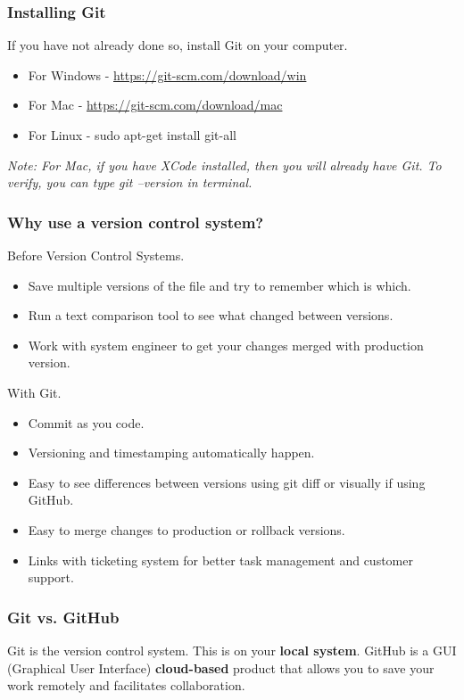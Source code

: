 \documentclass{beamer}
\begin{document}
\begin{frame}\frametitle{Installing Git}
If you have not already done so, install Git on your computer.
\vspace{1cm}
\begin{itemize}
\item For Windows - \url{https://git-scm.com/download/win}
\item For Mac - \url{https://git-scm.com/download/mac}
\item For Linux - sudo apt-get install git-all
\end{itemize}
\vspace{1cm}
\emph{Note: For Mac, if you have XCode installed, then you will already have Git. To verify, you can type git --version in terminal.}
\end{frame}

\begin{frame}\frametitle{Why use a version control system?}
Before Version Control Systems.
\begin{itemize}
\item Save multiple versions of the file and try to remember which is which.
\item Run a text comparison tool to see what changed between versions.
\item Work with system engineer to get your changes merged with production version.
\end{itemize}
With Git.
\begin{itemize}
\item Commit as you code.
\item Versioning and timestamping automatically happen.
\item Easy to see differences between versions using git diff or visually if using GitHub.
\item Easy to merge changes to production or rollback versions.
\item Links with ticketing system for better task management and customer support.
\end{itemize}
\end{frame}

\begin{frame}\frametitle{Git vs. GitHub}
Git is the version control system. This is on your \textbf{local system}.\newline\newline
GitHub is a GUI (Graphical User Interface) \textbf{cloud-based} product that allows you to save your work remotely and facilitates collaboration.\newline\newline
\end{frame}
\end{document}
